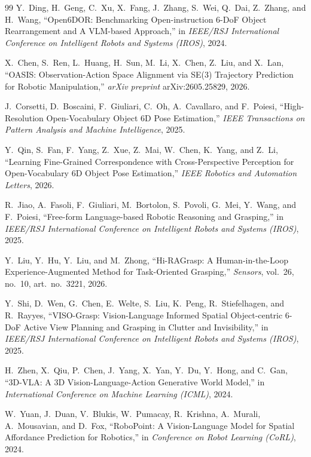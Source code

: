 \documentclass[11pt,a4paper]{article}
\begin{document}
\begin{thebibliography}{99}
Y.~Ding, H.~Geng, C.~Xu, X.~Fang, J.~Zhang, S.~Wei, Q.~Dai, Z.~Zhang, and H.~Wang,
``Open6DOR: Benchmarking Open-instruction 6-DoF Object Rearrangement and A VLM-based Approach,''
in \emph{IEEE/RSJ International Conference on Intelligent Robots and Systems (IROS)}, 2024.

X.~Chen, S.~Ren, L.~Huang, H.~Sun, M.~Li, X.~Chen, Z.~Liu, and X.~Lan,
``OASIS: Observation-Action Space Alignment via SE(3) Trajectory Prediction for Robotic Manipulation,''
\emph{arXiv preprint} arXiv:2605.25829, 2026.

J.~Corsetti, D.~Boscaini, F.~Giuliari, C.~Oh, A.~Cavallaro, and F.~Poiesi,
``High-Resolution Open-Vocabulary Object 6D Pose Estimation,''
\emph{IEEE Transactions on Pattern Analysis and Machine Intelligence}, 2025.

Y.~Qin, S.~Fan, F.~Yang, Z.~Xue, Z.~Mai, W.~Chen, K.~Yang, and Z.~Li,
``Learning Fine-Grained Correspondence with Cross-Perspective Perception for Open-Vocabulary 6D Object Pose Estimation,''
\emph{IEEE Robotics and Automation Letters}, 2026.

R.~Jiao, A.~Fasoli, F.~Giuliari, M.~Bortolon, S.~Povoli, G.~Mei, Y.~Wang, and F.~Poiesi,
``Free-form Language-based Robotic Reasoning and Grasping,''
in \emph{IEEE/RSJ International Conference on Intelligent Robots and Systems (IROS)}, 2025.

Y.~Liu, Y.~Hu, Y.~Liu, and M.~Zhong,
``Hi-RAGrasp: A Human-in-the-Loop Experience-Augmented Method for Task-Oriented Grasping,''
\emph{Sensors}, vol.~26, no.~10, art.~no.~3221, 2026.

Y.~Shi, D.~Wen, G.~Chen, E.~Welte, S.~Liu, K.~Peng, R.~Stiefelhagen, and R.~Rayyes,
``VISO-Grasp: Vision-Language Informed Spatial Object-centric 6-DoF Active View Planning and Grasping in Clutter and Invisibility,''
in \emph{IEEE/RSJ International Conference on Intelligent Robots and Systems (IROS)}, 2025.

H.~Zhen, X.~Qiu, P.~Chen, J.~Yang, X.~Yan, Y.~Du, Y.~Hong, and C.~Gan,
``3D-VLA: A 3D Vision-Language-Action Generative World Model,''
in \emph{International Conference on Machine Learning (ICML)}, 2024.

W.~Yuan, J.~Duan, V.~Blukis, W.~Pumacay, R.~Krishna, A.~Murali, A.~Mousavian, and D.~Fox,
``RoboPoint: A Vision-Language Model for Spatial Affordance Prediction for Robotics,''
in \emph{Conference on Robot Learning (CoRL)}, 2024.


\end{thebibliography}
\end{document}
